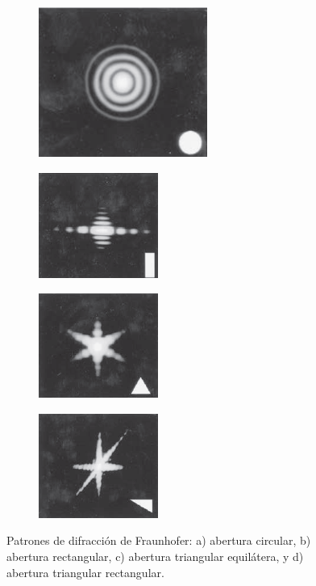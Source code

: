 \documentclass[14pt]{extarticle}
\begin{document}
\begin{figure}[H]
    \centering
    \begin{subfigure}{0.24\linewidth}
        \centering
        \includegraphics[scale=0.565]{Imagenes/Difraccion_19a.png}
        \caption{}
        \label{fig:figura_X_19a}
    \end{subfigure}%
    \begin{subfigure}{0.24\linewidth}
        \centering
        \includegraphics[scale=0.8]{Imagenes/Difraccion_19b.png}
        \caption{}
        \label{fig:figura_X_19b}
    \end{subfigure}%
    \begin{subfigure}{0.24\linewidth}
        \centering
        \includegraphics[scale=0.8]{Imagenes/Difraccion_19c.png}
        \caption{}
        \label{fig:figura_X_19c}
    \end{subfigure}%
    \begin{subfigure}{0.24\linewidth}
        \centering
        \includegraphics[scale=0.8]{Imagenes/Difraccion_19d.png}
        \caption{}
        \label{fig:figura_X_19d}
    \end{subfigure}
    \caption{Patrones de difracción de Fraunhofer: a) abertura circular, b) abertura rectangular, c) abertura triangular equilátera, y d) abertura triangular rectangular.}
    \label{fig:figura_X_19}
\end{figure}
\end{document}
